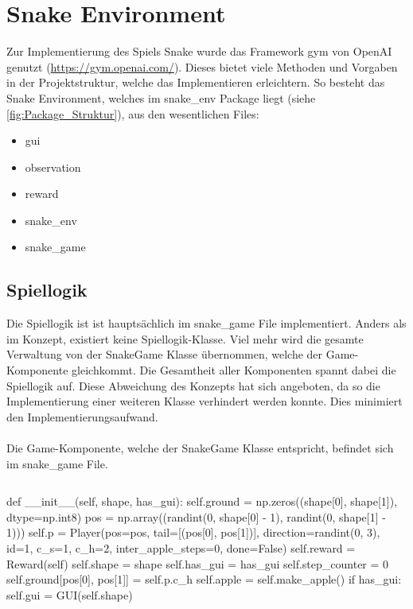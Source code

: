 \section{Snake Environment}
Zur Implementierung des Spiels Snake wurde das Framework gym von OpenAI genutzt (\url{https://gym.openai.com/}). Dieses bietet viele Methoden und Vorgaben in der Projektstruktur, welche das Implementieren erleichtern. So besteht das Snake Environment, welches im snake\_env Package liegt (siehe \ref{fig:Package_Struktur}), aus den wesentlichen Files:
\begin{itemize}
	\item gui
	\item observation
	\item reward
	\item snake\_env
	\item snake\_game
\end{itemize}

\subsection{Spiellogik}
Die Spiellogik ist ist hauptsächlich im snake\_game File implementiert. Anders als im Konzept, existiert keine Spiellogik-Klasse. Viel mehr wird die gesamte Verwaltung von der SnakeGame Klasse übernommen, welche der Game-Komponente gleichkommt. Die Gesamtheit aller Komponenten spannt dabei die Spiellogik auf. Diese Abweichung des Konzepts hat sich angeboten, da so die Implementierung einer weiteren Klasse verhindert werden konnte. Dies minimiert den Implementierungsaufwand.\\
\\Die Game-Komponente, welche der SnakeGame Klasse entspricht, befindet sich im snake\_game File.
\begin{lstlisting}[label=alg:SnakeGame_Konstruktor]
\end{lstlisting}
\begin{python} 
	def __init__(self, shape, has_gui):
		self.ground = np.zeros((shape[0], shape[1]), dtype=np.int8)
		pos = np.array((randint(0, shape[0] - 1), randint(0, shape[1] - 1)))
		self.p = Player(pos=pos, tail=[(pos[0], pos[1])], direction=randint(0, 3), id=1, c_s=1, c_h=2,
		inter_apple_steps=0, done=False)
		self.reward = Reward(self)
		self.shape = shape
		self.has_gui = has_gui
		self.step_counter = 0
		self.ground[pos[0], pos[1]] = self.p.c_h
		self.apple = self.make_apple()
		if has_gui:
		self.gui = GUI(self.shape)
\end{python}

